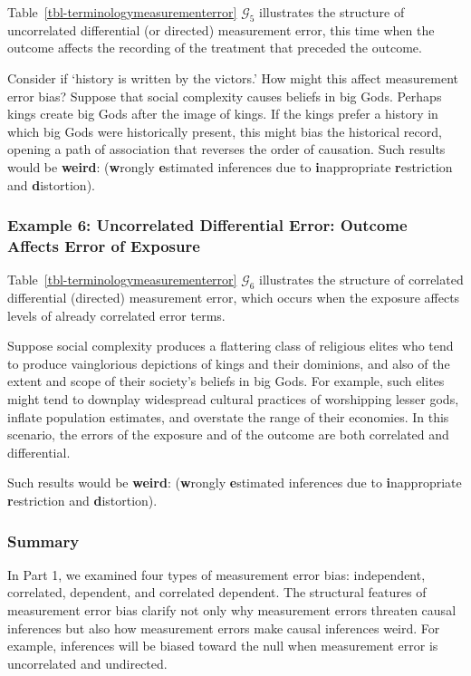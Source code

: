 \documentclass[
  single column]{article}
\begin{document}
Table~\ref{tbl-terminologymeasurementerror} \(\mathcal{G}_5\)
illustrates the structure of uncorrelated differential (or directed)
measurement error, this time when the outcome affects the recording of
the treatment that preceded the outcome.

Consider if `history is written by the victors.' How might this affect
measurement error bias? Suppose that social complexity causes beliefs in
big Gods. Perhaps kings create big Gods after the image of kings. If the
kings prefer a history in which big Gods were historically present, this
might bias the historical record, opening a path of association that
reverses the order of causation. Such results would be \textbf{weird}:
(\textbf{w}rongly \textbf{e}stimated inferences due to
\textbf{i}nappropriate \textbf{r}estriction and \textbf{d}istortion).

\subsubsection{Example 6: Uncorrelated Differential Error: Outcome
Affects Error of
Exposure}\label{example-6-uncorrelated-differential-error-outcome-affects-error-of-exposure}

Table~\ref{tbl-terminologymeasurementerror} \(\mathcal{G}_6\)
illustrates the structure of correlated differential (directed)
measurement error, which occurs when the exposure affects levels of
already correlated error terms.

Suppose social complexity produces a flattering class of religious
elites who tend to produce vainglorious depictions of kings and their
dominions, and also of the extent and scope of their society's beliefs
in big Gods. For example, such elites might tend to downplay widespread
cultural practices of worshipping lesser gods, inflate population
estimates, and overstate the range of their economies. In this scenario,
the errors of the exposure and of the outcome are both correlated and
differential.

Such results would be \textbf{weird}: (\textbf{w}rongly
\textbf{e}stimated inferences due to \textbf{i}nappropriate
\textbf{r}estriction and \textbf{d}istortion).

\subsubsection{Summary}\label{summary}

In Part 1, we examined four types of measurement error bias:
independent, correlated, dependent, and correlated dependent. The
structural features of measurement error bias clarify not only why
measurement errors threaten causal inferences but also how measurement
errors make causal inferences weird. For example, inferences will be
biased toward the null when measurement error is uncorrelated and
undirected.
\end{document}
